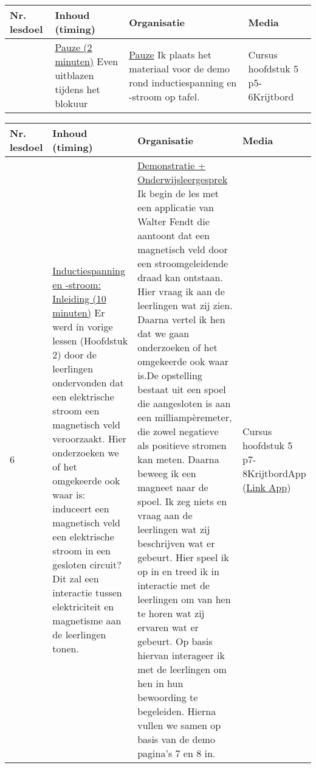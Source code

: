 \begin{landscape}
\begin{tabularx}{1.56\textwidth}{|p{1.5cm}|p{8cm}|X|p{3cm}|}
\hline
\textbf{Nr. lesdoel } & \textbf{Inhoud (timing)}  & \textbf{Organisatie } & \textbf{Media } \\ \hline
& \underline{Pauze (2 minuten)}\newline
Even uitblazen tijdens het blokuur
&  \underline{Pauze}\newline 
Ik plaats het materiaal voor de demo rond inductiespanning en -stroom op tafel.
&  Cursus hoofdstuk 5 p5-6\newline\newline Krijtbord
\\ \hline
\end{tabularx}\vspace{5mm}



\begin{tabularx}{1.56\textwidth}{|p{1.5cm}|p{9cm}|X|p{4cm}|}
	\hline
	\textbf{Nr. lesdoel } & \textbf{Inhoud (timing)}  & \textbf{Organisatie } & \textbf{Media } \\ \hline
	6\newline\newline 7& \underline{Inductiespanning en -stroom:} \underline{Inleiding (10 minuten)}\newline
	Er werd in vorige lessen (Hoofdstuk 2) door de leerlingen ondervonden dat een elektrische stroom een magnetisch veld veroorzaakt. Hier onderzoeken we of het omgekeerde ook waar is: induceert een magnetisch veld een elektrische stroom in een gesloten circuit? Dit zal een interactie tussen elektriciteit en magnetisme aan de leerlingen tonen.
	&  \underline{Demonstratie + Onderwijsleergesprek}\newline 
	Ik begin de les met een applicatie van Walter Fendt die aantoont dat een magnetisch veld door een stroomgeleidende draad kan ontstaan. Hier vraag ik aan de leerlingen wat zij zien. Daarna vertel ik hen dat we gaan onderzoeken of het omgekeerde ook waar is.\newline De opstelling bestaat uit een spoel die aangesloten is aan een milliampèremeter, die zowel negatieve als positieve stromen kan meten. Daarna beweeg ik een magneet naar de spoel. Ik zeg niets en vraag aan de leerlingen wat zij beschrijven wat er gebeurt. Hier speel ik op in en treed ik in interactie met de leerlingen om van hen te horen wat zij ervaren wat er gebeurt.	Op basis hiervan interageer ik met de leerlingen om hen in hun bewoording te begeleiden. Hierna vullen we samen op basis van de demo pagina's 7 en 8 in.
	&  Cursus hoofdstuk 5 p7-8\newline\newline Krijtbord\newline\newline App (\href{https://www.walter-fendt.de/html5/phnl/magneticfieldwire_nl.htm}{Link App})
	\\ \hline
\end{tabularx}\vspace{5mm}





\end{landscape}
